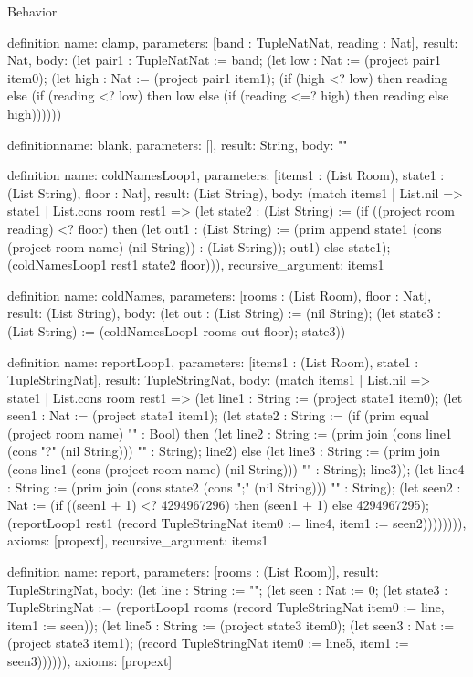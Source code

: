 \begin{lexlean}{Behavior}
\begin{semanticmodule}
definition{
  name: clamp,
  parameters: [band : TupleNatNat, reading : Nat],
  result: Nat,
  body: (let pair1 : TupleNatNat := band; (let low : Nat := (project pair1 item0); (let high : Nat := (project pair1 item1); (if (high <? low) then reading else (if (reading <? low) then low else (if (reading <=? high) then reading else high))))))
}

definition{name: blank, parameters: [], result: String, body: ""}

definition{
  name: coldNamesLoop1,
  parameters: [items1 : (List Room), state1 : (List String), floor : Nat],
  result: (List String),
  body: (match items1
    | List.nil => state1
    | List.cons room rest1 => (let state2 : (List String) := (if ((project room reading) <? floor) then (let out1 : (List String) := (prim append state1 (cons (project room name) (nil String)) : (List String)); out1) else state1); (coldNamesLoop1 rest1 state2 floor))),
  recursive_argument: items1
}

definition{
  name: coldNames,
  parameters: [rooms : (List Room), floor : Nat],
  result: (List String),
  body: (let out : (List String) := (nil String); (let state3 : (List String) := (coldNamesLoop1 rooms out floor); state3))
}

definition{
  name: reportLoop1,
  parameters: [items1 : (List Room), state1 : TupleStringNat],
  result: TupleStringNat,
  body: (match items1
    | List.nil => state1
    | List.cons room rest1 => (let line1 : String := (project state1 item0); (let seen1 : Nat := (project state1 item1); (let state2 : String := (if (prim equal (project room name) "" : Bool) then (let line2 : String := (prim join (cons line1 (cons "?" (nil String))) "" : String); line2) else (let line3 : String := (prim join (cons line1 (cons (project room name) (nil String))) "" : String); line3)); (let line4 : String := (prim join (cons state2 (cons ";" (nil String))) "" : String); (let seen2 : Nat := (if ((seen1 + 1) <? 4294967296) then (seen1 + 1) else 4294967295); (reportLoop1 rest1 (record TupleStringNat {item0 := line4, item1 := seen2})))))))),
  axioms: [propext],
  recursive_argument: items1
}

definition{
  name: report,
  parameters: [rooms : (List Room)],
  result: TupleStringNat,
  body: (let line : String := ""; (let seen : Nat := 0; (let state3 : TupleStringNat := (reportLoop1 rooms (record TupleStringNat {item0 := line, item1 := seen})); (let line5 : String := (project state3 item0); (let seen3 : Nat := (project state3 item1); (record TupleStringNat {item0 := line5, item1 := seen3})))))),
  axioms: [propext]
}


\end{semanticmodule}
\end{lexlean}
